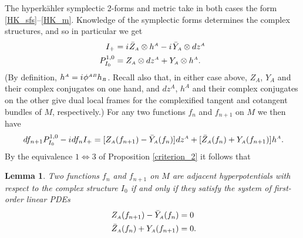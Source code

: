 \documentclass[11pt]{amsart}
\newtheorem{lemma}[theorem]{Lemma}
\theoremstyle{remark}
\theoremstyle{remark}
\theoremstyle{definition}
\theoremstyle{definition}
\theoremstyle{definition}
\newcommand{\0}{{\scriptstyle 0'}} %
\newcommand{\1}{{\scriptstyle 1'}}
\newcommand{\A}{{\scriptscriptstyle A}} %
\newcommand{\B}{{\scriptscriptstyle B}}
\newcommand{\pt}{\hspace{1pt}} %
\newcommand{\hp}{\hspace{0.5pt}} %
\begin{document}
The hyperk\"ahler symplectic 2-forms and metric take in both cases the form \eqref{HK_sfs}--\eqref{HK_m}. Knowledge of the symplectic forms determines the complex structures, and so in particular we get
{\allowdisplaybreaks
\begin{equation} \label{HK-c-strs}
\begin{aligned}
I_+ & = i \hp \bar{Z}_{\A} \otimes h^{\A} - i \pt \bar{Y}_{\A} \otimes dz^{\A} \\
P^{1,0}_{I_0} & = Z_{\A} \otimes dz^{\A} + Y_{\A} \otimes h^{\A}  \rlap{.}
\end{aligned}
\end{equation}
}%
(By definition, $h^{\A} = i \hp \phi^{\A\B} h_{\B}$. Recall also that, in either case above, $Z_{\A}$, $Y_{\A}$ and their complex conjugates on one hand, and $dz^{\A}$, $h^{\A}$ and their complex conjugates on the other give dual local frames for the complexified tangent and cotangent bundles of $M$, respectively.) For any two functions $f_{n}$ and $f_{n+1}$ on $M$ we then have
\begin{equation}
df_{n+1} P^{1,0}_{I_0} - i \hp df_n I_+ = [Z_{\A}(f_{n+1}) - \bar{Y}_{\A}(f_n)] \hp dz^{\A} + [\bar{Z}_{\A}(f_n) + Y_{\A}(f_{n+1})] \hp h^{\A} \rlap{.}
\end{equation}
By the equivalence $1 \Leftrightarrow 3$ of Proposition \ref{criterion_2} it follows that 

\begin{lemma} \label{YZ-hyperpot}
Two functions $f_{n}$ and $f_{n+1}$ on $M$ are adjacent hyperpotentials with respect to the complex structure $I_0$ if and only if they satisfy the system of first-order linear PDEs
\begin{equation}
\begin{aligned}
Z_{\A}(f_{n+1}) - \bar{Y}_{\A}(f_n) & = 0 \\
\bar{Z}_{\A}(f_n) + Y_{\A}(f_{n+1}) & = 0 \rlap{.}
\end{aligned}
\end{equation}
\end{lemma}
\end{document}
